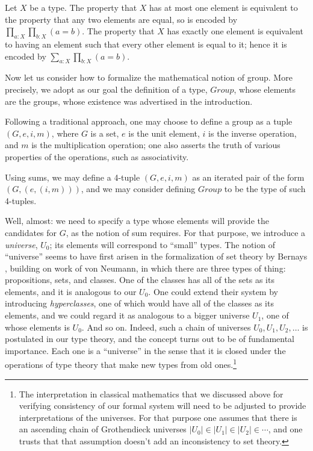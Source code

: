 \documentclass[letter,12pt]{amsart}
\theoremstyle{definition}
\theoremstyle{remark}
\numberwithin{equation}{section}
\begin{document}
Let $X$ be a type.  The property that $X$ has at most one element is equivalent to the property that any two
elements are equal, so is encoded by $\prod_{a:X} \prod_{b:X} (a=b)$.  The property that $X$ has exactly one element is equivalent to having an
element such that every other element is equal to it; hence it is encoded by $\sum_{a:X} \prod_{b:X} (a=b)$.

Now let us consider how to formalize the mathematical notion of group.  More precisely, we adopt as our goal the definition of a type, $Group$,
whose elements are the groups, whose existence was advertised in the introduction.

Following a traditional approach, one may choose to define a group as a tuple $(G,e,i,m)$, where $G$ is a set, $e$ is the unit element, $i$ is
the inverse operation, and $m$ is the multiplication operation; one also asserts the truth of various properties of the operations, such as
associativity.

Using sums, we may define a 4-tuple $(G,e,i,m)$ as an iterated pair of the form $(G,(e,(i,m)))$, and we may consider defining $Group$ to be the
type of such 4-tuples.

Well, almost: we need to specify a type whose elements will provide the candidates for $G$, as the notion of sum requires.  For that purpose, we
introduce a {\em universe}, $U_0$; its elements will correspond to ``small'' types.  The notion of ``universe'' seems to have first arisen in
the formalization of set theory by Bernays \citep{bernays-1}, building on work of von Neumann, in which there are three types of thing:
propositions, sets, and classes.  One of the classes has all of the sets as its elements, and it is analogous to our $U_0$.  One could extend
their system by introducing {\em hyperclasses}, one of which would have all of the classes as its elements, and we could regard it as analogous to a
bigger universe $U_1$, one of whose elements is $U_0$.  And so on.  Indeed, such a chain of universes $U_0, U_1, U_2, \dots$ is postulated in our type theory, and the
concept turns out to be of fundamental importance.  Each one is a ``universe'' in the sense that it is closed under the operations of type
theory that make new types from old ones.\footnote{The interpretation in classical mathematics that we discussed above for verifying consistency
  of our formal system will need to be adjusted to provide interpretations of the universes.  For that purpose one assumes that there is an
  ascending chain of Grothendieck universes $|U_0| \in |U_1| \in |U_2| \in \cdots$, and one trusts that that assumption doesn't add an inconsistency to set
  theory.}
\end{document}
